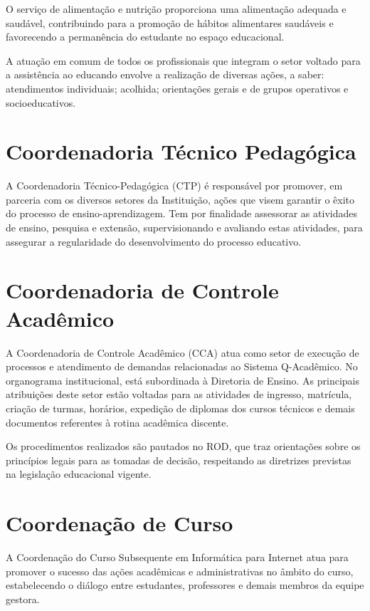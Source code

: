 \documentclass[
	12pt,				%
	openright,			%
	twoside,			%
	a4paper,			%
	chapter=TITLE,		%
	english,			%
	french,				%
	spanish,			%
	brazil,				%
	]{abntex2}
\begin{document}
O serviço de alimentação e nutrição proporciona uma alimentação adequada e saudável, contribuindo para a promoção de hábitos alimentares saudáveis e favorecendo a permanência do estudante no espaço educacional.

A atuação em comum de todos os profissionais que integram o setor voltado para a assistência ao educando envolve a realização de diversas ações, a saber: atendimentos individuais; acolhida; orientações gerais e de grupos operativos e socioeducativos.

\section{Coordenadoria Técnico Pedagógica}
A Coordenadoria Técnico-Pedagógica (CTP) é responsável por promover, em parceria com os diversos setores da Instituição, ações que visem garantir o êxito do processo de ensino-aprendizagem. Tem por finalidade assessorar as atividades de ensino, pesquisa e extensão, supervisionando e avaliando estas atividades, para assegurar a regularidade do desenvolvimento do processo educativo.


\section{Coordenadoria de Controle Acadêmico}
A Coordenadoria de Controle Acadêmico (CCA) atua como setor de execução de processos e atendimento de demandas relacionadas ao Sistema Q-Acadêmico. No organograma institucional, está subordinada à Diretoria de Ensino. As principais atribuições deste setor estão voltadas para as atividades de ingresso, matrícula, criação de turmas, horários, expedição de diplomas dos cursos técnicos e demais documentos referentes à rotina acadêmica discente.

Os procedimentos realizados são pautados no ROD, que traz orientações sobre os princípios legais para as tomadas de decisão, respeitando as diretrizes previstas na legislação educacional vigente.


\section{Coordenação de Curso}

A Coordenação do Curso Subsequente em Informática para Internet atua para promover o sucesso das ações acadêmicas e administrativas no âmbito do curso, estabelecendo o diálogo entre estudantes, professores e demais membros da equipe gestora.
\end{document}
